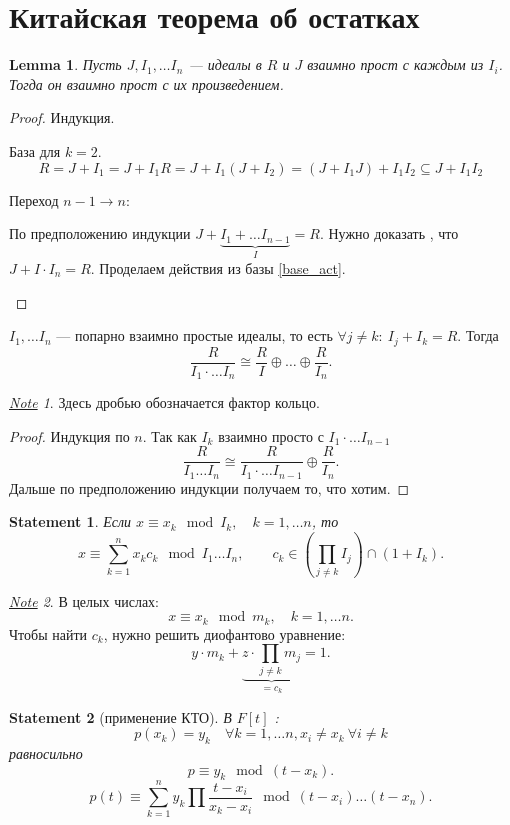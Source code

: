 \documentclass[11pt]{book}
\newcommand{\slim}{\sum\limits}
\theoremstyle{definition}
\theoremstyle{plain}
\theoremstyle{plain}
\newtheorem{lm}{Lemma}
\newtheorem{st}{Statement}
\theoremstyle{definition}
\theoremstyle{remark}
\newtheorem*{note}{\underline{Note}}
\begin{document}
\section{Китайская теорема об остатках}
\begin{lm}
    Пусть $ J, I_1, \ldots I_n $ ---  идеалы в $ R$ и $ J$ взаимно прост с каждым из  $ I_i$. Тогда он взаимно прост с их произведением. 
\end{lm}
\begin{proof}
    Индукция.
    \begin{description}
	\item 
    База для $ k=2$. 
    \begin{equation}\label{base_act}
	R = J + I_1 = J + I_1R = J + I_1(J + I_2) = (J + I_1 J) + I_1I_2 \subseteq J + I_1I_2
    \end{equation}
\item 
    Переход $ n-1 \to  n$:

    По предположению индукции $ J + \underbrace{I_1 + \ldots  I_{n-1}}_{I} = R$. Нужно доказать , что $ J + I \cdot I_n = R$.
    Проделаем действия из базы \ref{base_act}.
    \end{description}
\end{proof}
\begin{thm}
    $ I_1, \ldots  I_n$ --- попарно взаимно простые идеалы, то есть $ \forall  j \ne k:~ I_j + I_k = R$.
    Тогда \[
	\frac{R}{I_1\cdot \ldots I_n } \cong \frac{R}{I} \oplus \ldots  \oplus \frac{R}{I_n}
    .\] 
    \begin{note}
        Здесь дробью обозначается фактор кольцо.
    \end{note}
\end{thm}
\begin{proof}
    Индукция по $ n$.
    Так как $ I_k$ взаимно просто с  $ I_1\cdot \ldots I_{n-1}$
    \[
	\frac{R}{I_1 \ldots I_n} \cong \frac{R}{I_1 \cdot \ldots I_{n-1} } \oplus \frac{R}{I_n}
    .\] 
    Дальше по предположению индукции получаем то, что хотим.
\end{proof}
\begin{st}
 Если $ x \equiv x_k \mod I_k, \quad k = 1, \ldots n$, то
 \[
     x \equiv \slim_{k=1}^{n} x_k c_k \mod I_1 \ldots I_n, \qquad c_k \in  \left(\prod_{j \ne k} I_j\right) \cap (1 + I_k)
    .\] 
\end{st}
\begin{note}
    В целых числах:
    \[
    x \equiv x_k \mod m_k, \quad k = 1, \ldots  n
    .\] 
    Чтобы найти $ c_k$, нужно решить диофантово уравнение:
    \[
	y \cdot m_k + \underbrace{z \cdot \prod_{j \ne k} m_j}_{=c_k} = 1 
    .\] 
\end{note}
\begin{st}[применение КТО]
    В $ F[t]$ :
    \[
	p(x_k) = y_k \quad \forall  k = 1, \ldots n, x_i \ne x_k  ~ \forall  i \ne k
    \] 
равносильно
    \[
	p \equiv y_k \mod (t - x_k)    
    .\] 
    \[
	p(t) \equiv \slim_{k=1}^{n} y_k \prod \frac{t -x_i}{x_k - x_i} \mod (t - x_i) \ldots (t - x_n)
    .\] 
\end{st}
\end{document}
